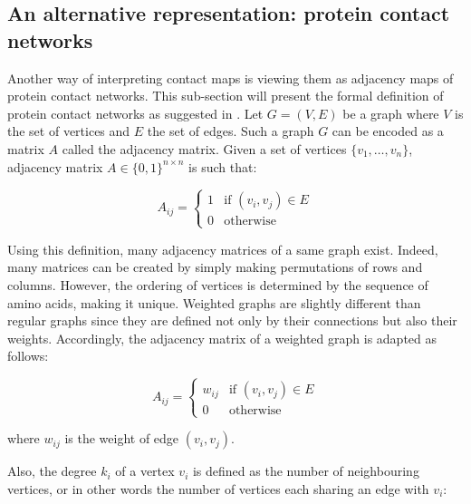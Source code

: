     \subsection{An alternative representation: protein contact networks} \label{pcn}

        Another way of interpreting contact maps is viewing them as adjacency maps of protein contact networks.
        This sub-section will present the formal definition of protein contact networks as suggested in \cite{doi:10.1021/cr3002356}.
        Let $G = (V, E)$ be a graph where $V$ is the set of vertices and $E$ the set of edges. Such a graph $G$ can be encoded as a matrix $A$ called
        the adjacency matrix. Given a set of vertices $\{ v_1, \ldots, v_n \}$, adjacency matrix $A \in \{ 0, 1 \}^{n \times n}$ is such that:

        \begin{equation}
            A_{ij} =
                \begin{cases}
                    1 & \text{if } (v_i, v_j) \in E \\
                    0 & \text{otherwise}
                \end{cases}
        \end{equation}

        Using this definition, many adjacency matrices of a same graph exist. Indeed, many matrices can be created by simply
        making permutations of rows and columns. However, the ordering of vertices is determined by the sequence
        of amino acids, making it unique.
        Weighted graphs are slightly different than regular graphs since they are defined not only by their connections but also their weights.
        Accordingly, the adjacency matrix of a weighted graph is adapted as follows:

        \begin{equation}
            A_{ij} =
                \begin{cases}
                    w_{ij} & \text{if } (v_i, v_j) \in E \\
                    0 & \text{otherwise}
                \end{cases}
        \end{equation}

        where $w_{ij}$ is the weight of edge $(v_i, v_j)$.

        Also, the degree $k_i$ of a vertex $v_i$ is defined as the number of neighbouring vertices, or in other  %
        words the number of vertices each sharing an edge with $v_i$:


